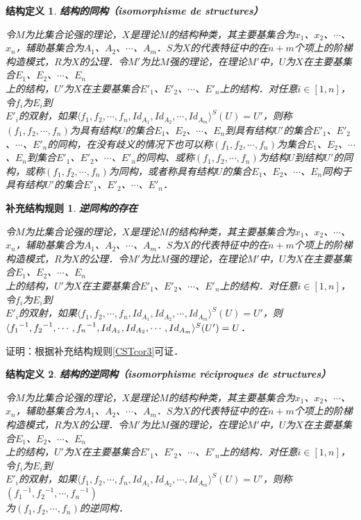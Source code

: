 \documentclass[12pt, a4paper, oneside]{book}
\newtheorem{STdef}{结构定义}
\newtheorem{CSTcor}{补充结构规则}
\begin{document}
			\begin{STdef}
				\textbf{结构的同构（isomorphisme de structures）}
				\par
				令$M$为比集合论强的理论，$X$是理论$M$的结构种类，其主要基集合为$x_1$、$x_2$、$\cdots$、$x_n$，辅助基集合为$A_1$、$A_2$、$\cdots$、$A_m$．$S$为$X$的代表特征中的在$n+m$个项上的阶梯构造模式，$R$为$X$的公理．令$M'$为比$M$强的理论，在理论$M'$中，$U$为$X$在主要基集合$E_1$、$E_2$、$\cdots$、$E_n$\\上的结构，$U'$为$X$在主要基集合${E'}_1$、${E'}_2$、$\cdots$、${E'}_n$上的结构．对任意$i\in [1, n]$，令$f_i$为$E_i$到\\${E'}_i$的双射，如果$\langle f_1, f_2, \cdots, f_n, Id_{A_1}, Id_{A_2}, \cdots, Id_{A_m}\rangle^S(U)=U'$，则称$(f_1, f_2, \cdots, f_n)$为具有结构$U$的集合$E_1$、$E_2$、$\cdots$、$E_n$到具有结构$U'$的集合${E'}_1$、${E'}_2$、$\cdots$、${E'}_n$的同构，在没有歧义的情况下也可以称$(f_1, f_2, \cdots, f_n)$为集合$E_1$、$E_2$、$\cdots$、$E_n$到集合${E'}_1$、${E'}_2$、$\cdots$、${E'}_n$的同构、或称$(f_1, f_2, \cdots, f_n)$为结构$U$到结构$U'$的同构，或称$(f_1, f_2, \cdots, f_n)$为同构，或者称具有结构$U$的集合$E_1$、$E_2$、$\cdots$、$E_n$同构于具有结构$U'$的集合${E'}_1$、${E'}_2$、$\cdots$、${E'}_n$．
			\end{STdef}
			
			\begin{CSTcor}\label{CSTcor4}
				\textbf{逆同构的存在}
				\par
				令$M$为比集合论强的理论，$X$是理论$M$的结构种类，其主要基集合为$x_1$、$x_2$、$\cdots$、$x_n$，辅助基集合为$A_1$、$A_2$、$\cdots$、$A_m$．$S$为$X$的代表特征中的在$n+m$个项上的阶梯构造模式，$R$为$X$的公理．令$M'$为比$M$强的理论，在理论$M'$中，$U$为$X$在主要基集合$E_1$、$E_2$、$\cdots$、$E_n$\\上的结构，$U'$为$X$在主要基集合${E'}_1$、${E'}_2$、$\cdots$、${E'}_n$上的结构．对任意$i\in [1, n]$，令$f_i$为$E_i$到\\${E'}_i$的双射，如果$\langle f_1, f_2, \cdots, f_n, Id_{A_1}, Id_{A_2}, \cdots, Id_{A_m}\rangle^S(U)=U'$，则$\langle {f_1}^{-1}, {f_2}^{-1}, \cdots, {f_n}^{-1}, \\Id_{A_1}, Id_{A_2}, \cdots, Id_{A_m}\rangle^S(U')=U$．
			\end{CSTcor}
			证明：根据补充结构规则\ref{CSTcor3}可证．

			\begin{STdef}
				\textbf{结构的逆同构（isomorphisme réciproques de structures）}
				\par
				令$M$为比集合论强的理论，$X$是理论$M$的结构种类，其主要基集合为$x_1$、$x_2$、$\cdots$、$x_n$，辅助基集合为$A_1$、$A_2$、$\cdots$、$A_m$．$S$为$X$的代表特征中的在$n+m$个项上的阶梯构造模式，$R$为$X$的公理．令$M'$为比$M$强的理论，在理论$M'$中，$U$为$X$在主要基集合$E_1$、$E_2$、$\cdots$、$E_n$\\上的结构，$U'$为$X$在主要基集合${E'}_1$、${E'}_2$、$\cdots$、${E'}_n$上的结构．对任意$i\in [1, n]$，令$f_i$为$E_i$到\\${E'}_i$的双射，如果$\langle f_1, f_2, \cdots, f_n, Id_{A_1}, Id_{A_2}, \cdots, Id_{A_m}\rangle^S(U)=U'$，则称$({f_1}^{-1}, {f_2}^{-1}, \cdots, {f_n}^{-1})$\\为$(f_1, f_2, \cdots, f_n)$的逆同构．
			\end{STdef}
\end{document}
